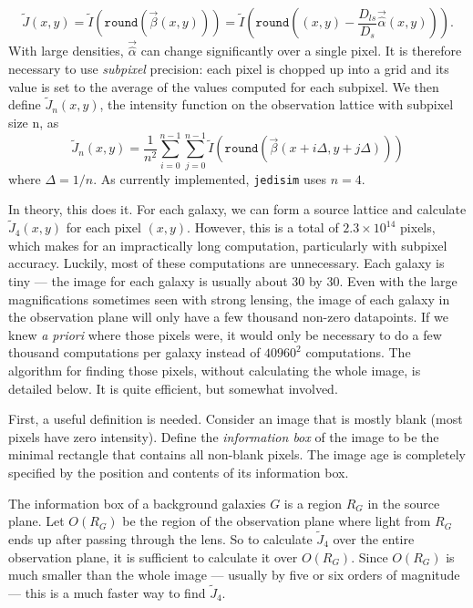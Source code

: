 \documentclass[10pt,twoside]{article}
\theoremstyle{definition}
\theoremstyle{exercise}
\begin{document}
\begin{equation}
  \tilde{J}(x,y) = \tilde{I}\left( \texttt{round}\left( \vec{\beta}(x,y) \right)\right) = \tilde{I}\left(\texttt{round} \left( (x,y)- \frac{D_{ls}}{D_s} \vec{\hat{\alpha}}(x,y)  \right)\right).
  \label{eq:discrete_lens_intensity_eq}
\end{equation}
With large densities, $\vec{\hat{\alpha}}$ can change significantly over a single pixel. It is therefore necessary to use \textit{subpixel} precision: each pixel is chopped up into a grid and its value is set to the average of the values computed for each subpixel. We then define $\tilde{J}_n(x,y)$, the intensity function on the observation lattice with subpixel size n, as
\begin{equation}
  \tilde{J}_n(x,y) = \frac{1}{n^2}\sum_{i=0}^{n-1}\sum_{j=0}^{n-1} \tilde{I}\left( \texttt{round}\left( \vec{\beta}(x+i\Delta,y+j\Delta) \right)\right)
  \label{eq:discrete_subpixel_lens_intensity_eq}
\end{equation}
where $\Delta = 1/n$. As currently implemented, \texttt{jedisim} uses $n=4$.

In theory, this does it. For each galaxy, we can form a source lattice and calculate $\tilde{J}_4(x,y)$ for each pixel $(x,y)$. However, this is a total of $2.3 \times 10^{14}$ pixels, which makes for an impractically long computation, particularly with subpixel accuracy. Luckily, most of these computations are unnecessary. Each galaxy is tiny --- the image for each galaxy is usually about 30 by 30. Even with the large magnifications sometimes seen with strong lensing, the image of each galaxy in the observation plane will only have a few thousand non-zero datapoints. If we knew \textit{a priori} where those pixels were, it would only be necessary to do a few thousand computations per galaxy instead of $40960^2$ computations. The algorithm for finding those pixels, without calculating the whole image, is detailed below. It is quite efficient, but somewhat involved.

First, a useful definition is needed. Consider an image that is mostly blank (most pixels have zero intensity). Define the \textit{information box} of the image to be the minimal rectangle that contains all non-blank pixels.  The image age is completely specified by the position and contents of its information box.


The information box of a background galaxies $G$ is a region $R_G$ in the source plane. Let $O(R_G)$ be the region of the observation plane where light from $R_G$ ends up after passing through the lens. So to calculate $\tilde{J}_4$ over the entire observation plane, it is sufficient to calculate it over $O(R_G)$. Since $O(R_G)$ is much smaller than the whole image --- usually by five or six orders of magnitude --- this is a much faster way to find $\tilde{J}_4$.
\end{document}
